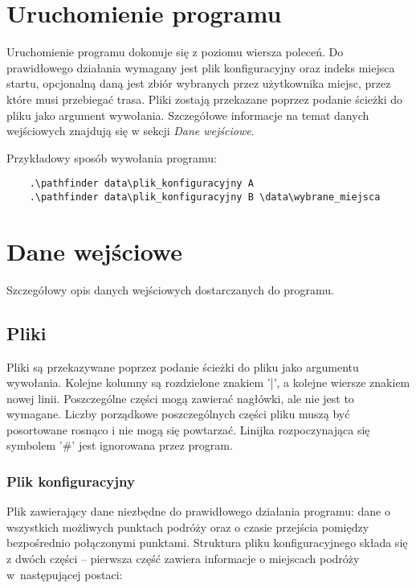 \documentclass{article}
\begin{document}
\vspace{15pt}
\section{Uruchomienie programu}
Uruchomienie programu dokonuje się z poziomu wiersza poleceń. Do prawidłowego działania wymagany jest plik konfiguracyjny oraz indeks miejsca startu, opcjonalną daną jest zbiór wybranych przez użytkownika miejsc, przez które musi przebiegać trasa. Pliki zostają przekazane poprzez podanie ścieżki do pliku jako argument wywołania. Szczegółowe informacje na temat danych wejściowych znajdują się w sekcji \textit{Dane wejściowe}. 

\vspace{10pt}
Przykładowy sposób wywołania programu:
\vspace{-8pt}
\begin{verbatim}
    .\pathfinder data\plik_konfiguracyjny A
    .\pathfinder data\plik_konfiguracyjny B \data\wybrane_miejsca
\end{verbatim}

\vspace{15pt}
\section{Dane wejściowe}
Szczegółowy opis danych wejściowych dostarczanych do programu.

\subsection{Pliki}
Pliki są przekazywane poprzez podanie ścieżki do pliku jako argumentu wywołania. Kolejne kolumny są rozdzielone znakiem '|', a kolejne wiersze znakiem nowej linii. Poszczególne części mogą zawierać nagłówki, ale nie jest to wymagane. Liczby porządkowe poszczególnych części pliku muszą być posortowane rosnąco i nie mogą się powtarzać. Linijka rozpoczynająca się symbolem '\#' jest ignorowana przez program.

\subsubsection{Plik konfiguracyjny}
Plik zawierający dane niezbędne do prawidłowego działania programu: dane o wszystkich możliwych punktach podróży oraz o czasie przejścia pomiędzy bezpośrednio połączonymi punktami. Struktura pliku konfiguracyjnego składa się z dwóch części -- pierwsza część zawiera informacje o miejscach podróży w~następującej postaci:
\end{document}
